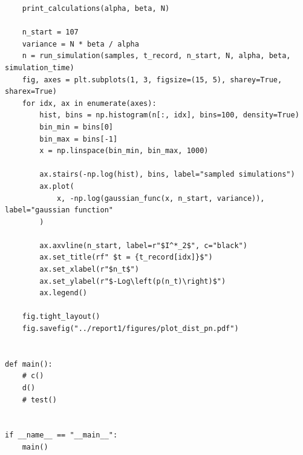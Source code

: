 \documentclass[15pt]{article}
\begin{document}
\begin{verbatim}
    print_calculations(alpha, beta, N)

    n_start = 107
    variance = N * beta / alpha
    n = run_simulation(samples, t_record, n_start, N, alpha, beta, simulation_time)
    fig, axes = plt.subplots(1, 3, figsize=(15, 5), sharey=True, sharex=True)
    for idx, ax in enumerate(axes):
        hist, bins = np.histogram(n[:, idx], bins=100, density=True)
        bin_min = bins[0]
        bin_max = bins[-1]
        x = np.linspace(bin_min, bin_max, 1000)

        ax.stairs(-np.log(hist), bins, label="sampled simulations")
        ax.plot(
            x, -np.log(gaussian_func(x, n_start, variance)), label="gaussian function"
        )

        ax.axvline(n_start, label=r"$I^*_2$", c="black")
        ax.set_title(rf" $t = {t_record[idx]}$")
        ax.set_xlabel(r"$n_t$")
        ax.set_ylabel(r"$-Log\left(p(n_t)\right)$")
        ax.legend()

    fig.tight_layout()
    fig.savefig("../report1/figures/plot_dist_pn.pdf")


def main():
    # c()
    d()
    # test()


if __name__ == "__main__":
    main()
\end{verbatim}
\end{document}
